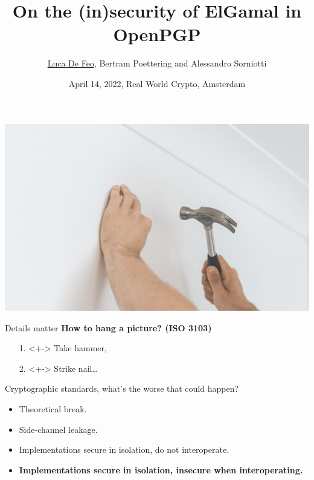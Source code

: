\documentclass[aspectratio=169]{beamer}
\title{On the (in)security of ElGamal in OpenPGP}
\author[De Feo, Poettering, Sorniotti]{\uline{Luca De Feo}, Bertram Poettering and Alessandro Sorniotti}
\date[Apr 14, 2022, RWC Amsterdam]{April 14, 2022, Real World Crypto, Amsterdam}
\institute[IBM Research]{IBM Research Zürich}
\begin{document}
\frame[plain]{\titlepage}

{
  {
    \includegraphics[width=\paperwidth,height=\paperheight]{hammer.jpg}
  }
  \begin{frame}{\Large Details matter}
    \Large
    \textbf{How to hang a picture? (ISO 3103\textonehalf)}
    \pause
    \bigskip
    \begin{itemize}
      \setlength{\itemsep}{1em}
    \item[1.]<+-> Take hammer,
    \item[2.]<+-> Strike nail\dots
    \end{itemize}
    \vspace{3cm}
  \end{frame}
}


\begin{frame}{Cryptographic standards, what's the worse that could happen?}
  \large
  \begin{itemize}
    \setlength{\itemsep}{1.2em}
  \item Theoretical break.
  \item Side-channel leakage.
  \item Implementations secure in isolation, do not interoperate.
  \item \bf Implementations secure in isolation, insecure when
    interoperating.
  \end{itemize}
\end{frame}

\end{document}
